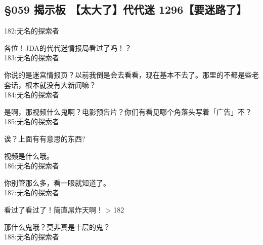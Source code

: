 \subsection{§059 揭示板 【太大了】代代迷 1296【要迷路了】}

182:无名的探索者

各位！JDA的代代迷情报局看过了吗！？\\

183:无名的探索者

你说的是迷宫情报页？以前我倒是会去看看，现在基本不去了。那里的不都是些老套话，根本就没有大新闻嘛？\\

184:无名的探索者

是啊，那视频什么鬼啊？电影预告片？你们有看见哪个角落头写着「广告」不？\\

185:无名的探索者

诶？上面有有意思的东西?

视频是什么哦。\\

186:无名的探索者

你别管那么多，看一眼就知道了。\\

187:无名的探索者

看过了看过了！简直屌炸天啊！ > 182

那什么鬼哦？莫非真是十层的鬼？\\

188:无名的探索者


